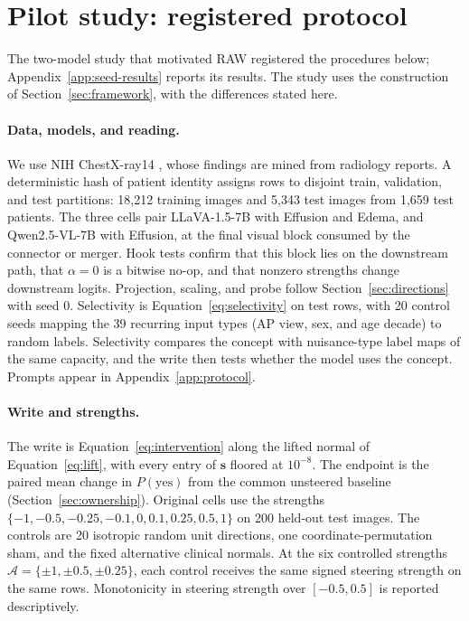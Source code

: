 \documentclass[11pt]{article}
\begin{document}
\section{Pilot study: registered protocol}
\label{app:seed}

The two-model study that motivated RAW registered the procedures below; Appendix~\ref{app:seed-results} reports its results. The study uses the construction of Section~\ref{sec:framework}, with the differences stated here.

\paragraph{Data, models, and reading.}
We use NIH ChestX-ray14 \citep{wang2017chestxray}, whose findings are mined from radiology reports. A deterministic hash of patient identity assigns rows to disjoint train, validation, and test partitions: 18,212 training images and 5,343 test images from 1,659 test patients. The three cells pair LLaVA-1.5-7B \citep{liu2024improved} with Effusion and Edema, and Qwen2.5-VL-7B \citep{bai2025qwen25vl} with Effusion, at the final visual block consumed by the connector or merger. Hook tests confirm that this block lies on the downstream path, that $\alpha=0$ is a bitwise no-op, and that nonzero strengths change downstream logits. Projection, scaling, and probe follow Section~\ref{sec:directions} with seed 0. Selectivity is Equation~\ref{eq:selectivity} on test rows, with 20 control seeds mapping the 39 recurring input types (AP view, sex, and age decade) to random labels. Selectivity compares the concept with nuisance-type label maps of the same capacity, and the write then tests whether the model uses the concept. Prompts appear in Appendix~\ref{app:protocol}.

\paragraph{Write and strengths.}
The write is Equation~\ref{eq:intervention} along the lifted normal of Equation~\ref{eq:lift}, with every entry of $\boldsymbol s$ floored at $10^{-8}$. The endpoint is the paired mean change in $P(\mathrm{yes})$ from the common unsteered baseline (Section~\ref{sec:ownership}). Original cells use the strengths $\{-1,-0.5,-0.25,-0.1,0,0.1,0.25,0.5,1\}$ on 200 held-out test images. The controls are 20 isotropic random unit directions, one coordinate-permutation sham, and the fixed alternative clinical normals. At the six controlled strengths $\mathcal A=\{\pm1,\pm0.5,\pm0.25\}$, each control receives the same signed steering strength on the same rows. Monotonicity in steering strength over $[-0.5,0.5]$ is reported descriptively.
\end{document}
